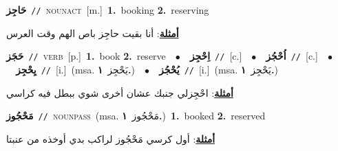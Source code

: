 \documentclass[10pt,a4paper,twoside]{article} %
\begin{document}
\begin{multicols}{2}
{\setlength\topsep{0pt}\textbf{\foreignlanguage{arabic}{حَاجِز}}\ {\color{gray}\texttt{//}\color{black}}\ \textsc{noun\textunderscore act}\ [m.]\ \textbf{1.}~booking  \textbf{2.}~reserving\  \begin{flushright}\color{gray}\foreignlanguage{arabic}{\textbf{\underline{\foreignlanguage{arabic}{أمثلة}}}: أنا بقيت حاجِز باص الهم وقت العرس}\end{flushright}\color{black}} \vspace{2mm}

{\setlength\topsep{0pt}\textbf{\foreignlanguage{arabic}{حَجَز}}\ {\color{gray}\texttt{//}\color{black}}\ \textsc{verb}\ [p.]\ \textbf{1.}~book  \textbf{2.}~reserve\ \ $\bullet$\ \ \setlength\topsep{0pt}\textbf{\foreignlanguage{arabic}{اِحْجِز}}\ {\color{gray}\texttt{//}\color{black}}\ [c.]\ \ $\bullet$\ \ \setlength\topsep{0pt}\textbf{\foreignlanguage{arabic}{اُحْجُز}}\ {\color{gray}\texttt{//}\color{black}}\ [c.]\ \ $\bullet$\ \ \setlength\topsep{0pt}\textbf{\foreignlanguage{arabic}{يِحْجِز}}\ {\color{gray}\texttt{//}\color{black}}\ [i.]\ \color{gray}(msa. \foreignlanguage{arabic}{يَحْجِز}~\foreignlanguage{arabic}{\textbf{١.}})\color{black}\ \ $\bullet$\ \ \setlength\topsep{0pt}\textbf{\foreignlanguage{arabic}{يُحْجُز}}\ {\color{gray}\texttt{//}\color{black}}\ [i.]\ \color{gray}(msa. \foreignlanguage{arabic}{يَحْجِز}~\foreignlanguage{arabic}{\textbf{١.}})\color{black}\  \begin{flushright}\color{gray}\foreignlanguage{arabic}{\textbf{\underline{\foreignlanguage{arabic}{أمثلة}}}: احْجِزلي جنبك عشان أخرى شوي ببطل فيه كراسي}\end{flushright}\color{black}} \vspace{2mm}

{\setlength\topsep{0pt}\textbf{\foreignlanguage{arabic}{مَحْجُوز}}\ {\color{gray}\texttt{//}\color{black}}\ \textsc{noun\textunderscore pass}\ \color{gray}(msa. \foreignlanguage{arabic}{مَحْجُوز}~\foreignlanguage{arabic}{\textbf{١.}})\color{black}\ \textbf{1.}~booked  \textbf{2.}~reserved\  \begin{flushright}\color{gray}\foreignlanguage{arabic}{\textbf{\underline{\foreignlanguage{arabic}{أمثلة}}}: أول كرسي مَحْجُوز لراكب بدي أوخذه من عنبتا}\end{flushright}\color{black}} \vspace{2mm}


\end{multicols}
\end{document}
